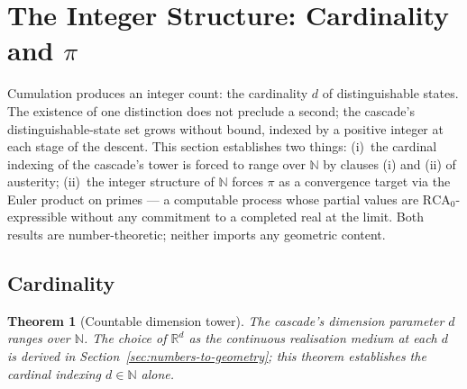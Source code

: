 \documentclass[11pt,a4paper]{article}
\newtheorem{theorem}{Theorem}[section]
\begin{document}
\section{The Integer Structure: Cardinality and \texorpdfstring{$\pi$}{pi}}\label{sec:integer-structure}

Cumulation produces an integer count: the cardinality $d$ of
distinguishable states. The existence of one distinction does not
preclude a second; the cascade's distinguishable-state set grows
without bound, indexed by a positive integer at each stage of the
descent. This section establishes two things: (i)~the cardinal
indexing of the cascade's tower is forced to range over $\mathbb{N}$
by clauses (i) and (ii) of austerity; (ii)~the integer structure of
$\mathbb{N}$ forces $\pi$ as a convergence target via the Euler
product on primes --- a computable process whose partial values are
$\mathrm{RCA}_0$-expressible without any commitment to a completed
real at the limit. Both results are number-theoretic; neither imports
any geometric content.

\subsection*{Cardinality}

\begin{theorem}[Countable dimension tower]\label{thm:iterate}
The cascade's dimension parameter $d$ ranges over $\mathbb{N}$. The
choice of $\mathbb{R}^d$ as the continuous realisation medium at each
$d$ is derived in Section~\ref{sec:numbers-to-geometry}; this theorem
establishes the cardinal indexing $d\in\mathbb{N}$ alone.
\end{theorem}
\end{document}
